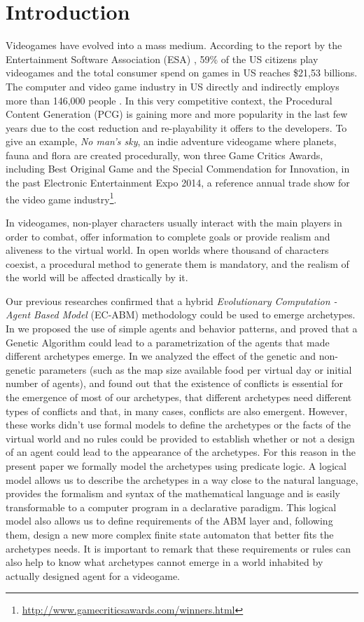 \documentclass[conference]{IEEEtran}
\begin{document}
\section{Introduction}
\label{sec:intro}

Videogames have evolved into a mass medium. According to the report by
the Entertainment Software Association (ESA) \cite{esa_ef_2014}, 59\%
of the US citizens play videogames and the total consumer spend on
games in US reaches \$21,53 billions. The computer and video game
industry in US directly and indirectly employs more than 146,000
people \cite{esa_century_2014}. In this very competitive context, the
Procedural Content Generation (PCG) is gaining more and more
popularity in the last few years due to the cost reduction and
re-playability it offers to the developers. To give an example,
\textit{No man's sky}, an indie adventure videogame where planets,
fauna and flora are created procedurally, won three Game Critics
Awards, including Best Original Game and the Special Commendation for
Innovation, in the past Electronic Entertainment Expo 2014, a
reference annual trade show for the video game
industry\footnote{\url{http://www.gamecriticsawards.com/winners.html}}. 

In videogames, non-player characters usually interact with the main
players in order to combat, offer information to complete goals or
provide realism and aliveness to the virtual world. In open worlds
where thousand of characters coexist, a procedural method to generate
them is mandatory, and the realism of the world will be affected
drastically by it.

Our previous researches confirmed that a hybrid \textit{Evolutionary Computation - Agent Based Model} (EC-ABM) methodology could be used to emerge archetypes. In \cite{garcia14my} we proposed the use of simple agents and behavior patterns, and proved that a Genetic Algorithm could lead to a parametrization of the agents that made different archetypes emerge. In \cite{garcia2015world} we analyzed the effect of the genetic and non-genetic parameters (such as the map size available food per virtual day or initial number of agents), and found out that the existence of conflicts is essential for the emergence of most of our archetypes, that different archetypes need different types of conflicts and that, in many cases, conflicts are also emergent. However, these works didn't use formal models to define the archetypes or the facts of the virtual world and no rules could be provided to establish whether or not a design of an agent could lead to the appearance of the archetypes. For this reason in the present paper we formally model the archetypes using predicate logic. A logical model allows us to describe the archetypes in a way close to the natural language, provides the formalism and syntax of the mathematical language and is easily transformable to a computer program in a declarative paradigm. This logical model also allows us to define requirements of the ABM layer and, following them, design a new more complex finite state automaton that better fits the archetypes needs. It is important to remark that these requirements or rules can also help to know what archetypes cannot emerge in a world inhabited by actually designed agent for a videogame.
 
\end{document}
